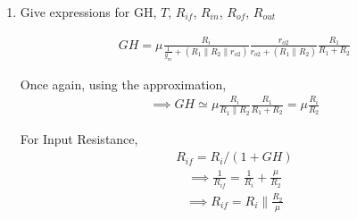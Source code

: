 \begin{enumerate}[label=\thesubsection.\arabic*.,ref=\thesubsection.\theenumi]
\begin{figure}[!ht]
\begin{center}
		\resizebox{\columnwidth}{!}{}
	\end{center}
\caption{}
\label{fig:Complete_Circuit}
\end{figure}


\begin{align}
    R_{i}=R_{s}\|R_{i d}\|(R_{1}+R_{2})
\end{align}
\begin{align}
    V_{i}=I_{i} R_{i}
\end{align}
\begin{align}
    I_{o}=-\mu V_{i} \frac{1}{1 / g_{m}+(R_{1}\|R_{2}\| r_{o 2})} \frac{r_{o 2}}{r_{o 2}+(R_{1} \| R_{2})}
\end{align}
\begin{align}
    G = \frac{I_{o}}{I_{i}}=-\mu \frac{R_{i}}{1 / g_{m}+(R_{1}\|R_{2}\| r_{o 2})} \frac{r_{o 2}}{r_{o 2}+(R_{1} \| R_{2})}
\end{align}
We use the approximation
\begin{align}
    1 / g_{m} \ll (R_{1}\|R_{2}\| r_{o 2})
\end{align}
This is because the $\frac{1}{g_{m}}$ is in order of few \ohm s but, $R_{1}$, $R_{2}$ and $r_{o2}$ are in order of k\ohm s 

\begin{align}
    G =-\mu \frac{R_{i}}{R_{1} \| R_{2}}
\end{align}
\begin{align}
    R_{o}=r_{o 2}+(R_{1} \| R_{2})+(g_{m} r_{o 2})(R_{1} \| R_{2})
\end{align}
\begin{align}
    \implies R_{o} \simeq g_{m} r_{o 2}\left(R_{1} \| R_{2}\right)
\end{align}

\item
Give expressions for GH, $T$, $R_{if}$, $R_{in}$, $R_{of}$, $R_{out}$

\solution
\begin{align}
    GH=\mu \frac{R_{i}}{\frac{1}{g_{m}}+(R_{1}\|R_{2}\| r_{o 2})} \frac{r_{o 2}}{r_{o 2}+(R_{1} \| R_{2})} \frac{R_{1}}{R_{1}+R_{2}}
\end{align}

Once again, using the approximation,
\begin{align}
    \implies GH \simeq \mu \frac{R_{i}}{R_{1} \| R_{2}} \frac{R_{1}}{R_{1}+R_{2}}=\mu \frac{R_{i}}{R_{2}}
\end{align}

For Input Resistance,
\begin{align}
    R_{if}=R_{i} /(1+GH)
\end{align}
\begin{align}
    \implies \frac{1}{R_{i f}}=\frac{1}{R_{i}}+\frac{\mu}{R_{2}}
\end{align}
\begin{align}
    \implies R_{i f}=R_{i} \| \frac{R_{2}}{\mu}
\end{align}


\end{enumerate}
